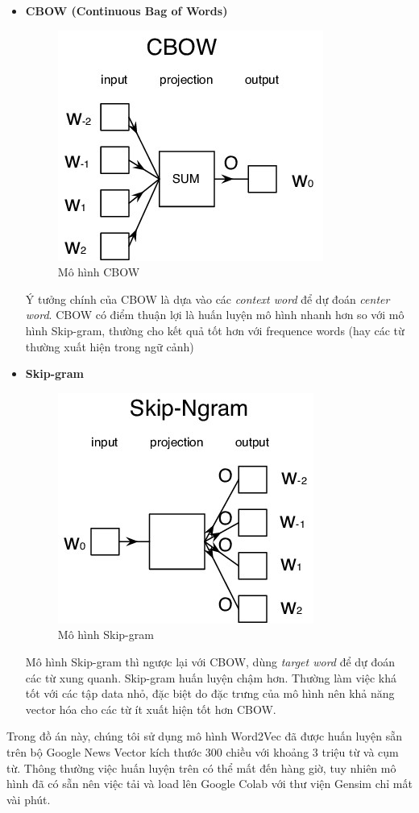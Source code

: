 \documentclass[12pt,a4paper,oneside]{book}
\begin{document}
	\begin{itemize}
	\item \textbf{CBOW (Continuous Bag of Words)} 
	
	\begin{figure}[H]
		\begin{center}
			\includegraphics[width=0.32\columnwidth]{cbow}
		\end{center}
		\caption{Mô hình CBOW}
	\end{figure}
	Ý tưởng chính của CBOW là dựa vào các \textit{context word} để dự đoán \textit{center word}. CBOW có điểm thuận lợi là huấn luyện mô hình nhanh hơn so với mô hình Skip-gram, thường cho kết quả tốt hơn với frequence words (hay các từ thường xuất hiện trong ngữ cảnh)
	\item \textbf{Skip-gram}
	
	\begin{figure}[H]
		\begin{center}
			\includegraphics[width=0.32\columnwidth]{skipgram}
		\end{center}
		\caption{Mô hình Skip-gram}
	\end{figure}
		
	Mô hình Skip-gram thì ngược lại với CBOW, dùng \textit{target word} để dự đoán các từ xung quanh. Skip-gram huấn luyện chậm hơn. Thường làm việc khá tốt với các tập data nhỏ, đặc biệt do đặc trưng của mô hình nên khả năng vector hóa cho các từ ít xuất hiện tốt hơn CBOW.
	
	\end{itemize}
	
	Trong đồ án này, chúng tôi sử dụng mô hình Word2Vec đã được huấn luyện sẵn trên bộ Google News Vector kích thước 300 chiều với khoảng 3 triệu từ và cụm từ. Thông thường việc huấn luyện trên có thể mất đến hàng giờ, tuy nhiên mô hình đã có sẵn nên việc tải và load lên Google Colab với thư viện Gensim chỉ mất vài phút. 
	
\end{document}
